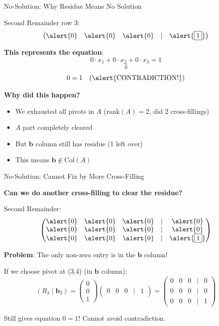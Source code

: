 \documentclass[10pt]{beamer}
\theoremstyle{definition}
\newcommand{\x}[1]{\alert{\textbf{#1}}}
\begin{document}
\begin{frame}{No-Solution: Why Residue Means No Solution}

Second Remainder row 3:
$$\begin{pmatrix} \alert{0} & \alert{0} & \alert{0} & | & \alert{\boxed{1}} \end{pmatrix}$$

\vspace{1em}

\x{This represents the equation}:
$$0 \cdot x_1 + 0 \cdot x_2 + 0 \cdot x_3 = 1$$
$$\Downarrow$$
$$0 = 1 \quad \text{(\alert{CONTRADICTION!})}$$

\vspace{1em}

\x{Why did this happen?}
\begin{itemize}
\item We exhausted all pivots in $A$ (rank$(A) = 2$, did 2 cross-fillings)
\item $A$ part completely cleared
\item But $\mathbf{b}$ column still has residue (1 left over)
\item \alert{This means $\mathbf{b} \notin \text{Col}(A)$}
\end{itemize}

\end{frame}

\begin{frame}{No-Solution: Cannot Fix by More Cross-Filling}

\x{Can we do another cross-filling to clear the residue?}

\vspace{1em}

Second Remainder:
$$\begin{pmatrix}
\alert{0} & \alert{0} & \alert{0} & | & \alert{0} \\
\alert{0} & \alert{0} & \alert{0} & | & \alert{0} \\
\alert{0} & \alert{0} & \alert{0} & | & \alert{\boxed{1}}
\end{pmatrix}$$

\vspace{1em}

\x{Problem}: The only non-zero entry is in the $\mathbf{b}$ column!

\vspace{1em}

If we choose pivot at (3,4) (in $\mathbf{b}$ column):
$$(R_3 \mid \mathbf{b}_3) = \begin{pmatrix} 0 \\ 0 \\ 1 \end{pmatrix} \begin{pmatrix} 0 & 0 & 0 & | & 1 \end{pmatrix} = \begin{pmatrix}
0 & 0 & 0 & | & 0 \\
0 & 0 & 0 & | & 0 \\
0 & 0 & 0 & | & 1
\end{pmatrix}$$

Still gives equation $0 = 1$! \alert{Cannot avoid contradiction.}

\end{frame}
\end{document}
